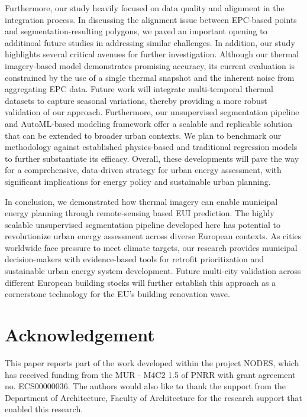 \documentclass[preprint,12pt]{elsarticle}
\begin{document}
    Furthermore, our study heavily focused on data quality and alignment in the integration process. In discussing the alignment issue between EPC-based points and segmentation-resulting polygons, we paved an important opening to additinoal future studies in addressing similar challenges. In addition, our study highlights several critical avenues for further investigation. Although our thermal imagery-based model demonstrates promising accuracy, its current evaluation is constrained by the use of a single thermal snapshot and the inherent noise from aggregating EPC data. Future work will integrate multi-temporal thermal datasets to capture seasonal variations, thereby providing a more robust validation of our approach. Furthermore, our unsupervised segmentation pipeline and AutoML-based modeling framework offer a scalable and replicable solution that can be extended to broader urban contexts. We plan to benchmark our methodology against established physics-based and traditional regression models to further substantiate its efficacy. Overall, these developments will pave the way for a comprehensive, data-driven strategy for urban energy assessment, with significant implications for energy policy and sustainable urban planning.
    
    In conclusion, we demonstrated how thermal imagery can enable municipal energy planning through remote-sensing based EUI prediction. The highly scalable unsupervised segmentation pipeline developed here has potential to revolutionize urban energy assessment across diverse European contexts. As cities worldwide face pressure to meet climate targets, our research provides municipal decision-makers with evidence-based tools for retrofit prioritization and sustainable urban energy system development. Future multi-city validation across different European building stocks will further establish this approach as a cornerstone technology for the EU's building renovation wave.

\section{Acknowledgement}    
    This paper reports part of the work developed within the project NODES, which has received funding from the MUR - M4C2 1.5 of PNRR with grant agreement no. ECS00000036. The authors would also like to thank the support from the Department of Architecture, Faculty of Architecture for the research support that enabled this research.

  
 





    
\end{document}
